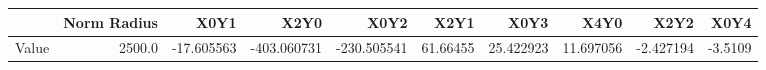 \documentclass[convert={convertexe={magick.exe}}]{standalone}
\begin{document}
\begin{tabular}{lrrrrrrrrr}
\toprule
{} &  Norm Radius &       X0Y1 &        X2Y0 &        X0Y2 &      X2Y1 &       X0Y3 &       X4Y0 &      X2Y2 &    X0Y4 \\
\midrule
Value &       2500.0 & -17.605563 & -403.060731 & -230.505541 &  61.66455 &  25.422923 &  11.697056 & -2.427194 & -3.5109 \\
\bottomrule
\end{tabular}
\end{document}
